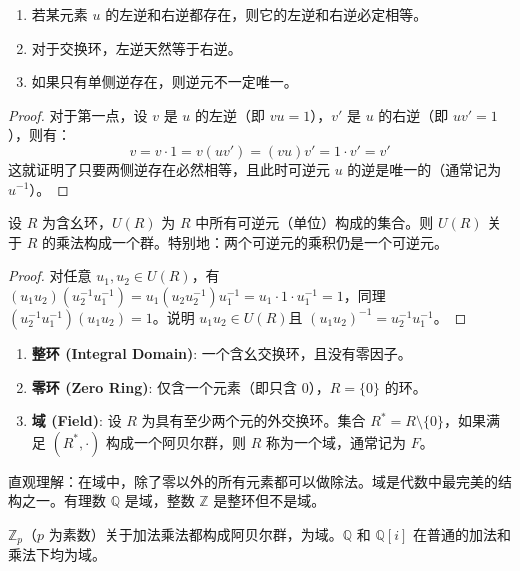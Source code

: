 \documentclass[11pt]{article}
\begin{document}
\begin{cnproperty}[有关可逆元的评论与性质]
\begin{enumerate}
    \item 若某元素 $u$ 的左逆和右逆都存在，则它的左逆和右逆必定相等。
    \item 对于交换环，左逆天然等于右逆。
    \item 如果只有单侧逆存在，则逆元不一定唯一。
\end{enumerate}
\end{cnproperty}
\begin{proof}
对于第一点，设 $v$ 是 $u$ 的左逆（即 $vu=1$），$v'$ 是 $u$ 的右逆（即 $uv'=1$），则有：
$$v = v \cdot 1 = v(uv') = (vu)v' = 1 \cdot v' = v'$$
这就证明了只要两侧逆存在必然相等，且此时可逆元 $u$ 的逆是唯一的（通常记为 $u^{-1}$）。
\end{proof}

\begin{cnproperty}
设 $R$ 为含幺环，$U(R)$ 为 $R$ 中所有可逆元（单位）构成的集合。则 $U(R)$ 关于 $R$ 的乘法构成一个群。特别地：两个可逆元的乘积仍是一个可逆元。
\end{cnproperty}
\begin{proof}
对任意 $u_1, u_2 \in U(R)$，有 $(u_1 u_2)(u_2^{-1} u_1^{-1}) = u_1 (u_2 u_2^{-1}) u_1^{-1} = u_1 \cdot 1 \cdot u_1^{-1} = 1$，同理 $(u_2^{-1} u_1^{-1})(u_1 u_2) = 1$。说明 $u_1 u_2 \in U(R)$且 $(u_1 u_2)^{-1} = u_2^{-1} u_1^{-1}$。
\end{proof}

\begin{cndefinition}[整环与域]
\begin{enumerate}
    \item \textbf{整环 (Integral Domain)}: 一个含幺交换环，且没有零因子。
    \item \textbf{零环 (Zero Ring)}: 仅含一个元素（即只含 $0$），$R=\{0\}$ 的环。
    \item \textbf{域 (Field)}: 设 $R$ 为具有至少两个元的外交换环。集合 $R^* = R \setminus \{0\}$，如果满足 $(R^*, \cdot)$ 构成一个阿贝尔群，则 $R$ 称为一个域，通常记为 $F$。
\end{enumerate}
\end{cndefinition}
直观理解：在域中，除了零以外的所有元素都可以做除法。域是代数中最完美的结构之一。有理数 $\mathbb{Q}$ 是域，整数 $\mathbb{Z}$ 是整环但不是域。

\begin{cnexample}
$\mathbb{Z}_p$（$p$ 为素数）关于加法乘法都构成阿贝尔群，为域。$\mathbb{Q}$ 和 $\mathbb{Q}[i]$ 在普通的加法和乘法下均为域。
\end{cnexample}
\end{document}
